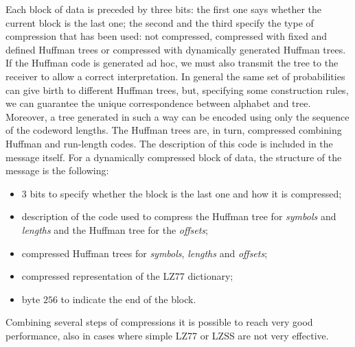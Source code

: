 Each block of data is preceded by three bits: the first one says whether the current block is the last one; the second and the third specify the type of compression that has been used: not compressed, compressed with fixed and defined Huffman trees or compressed with dynamically generated Huffman trees. If the Huffman code is generated ad hoc, we must also transmit the tree to the receiver to allow a correct interpretation. In general the same set of probabilities can give birth to different Huffman trees, but, specifying some construction rules, we can guarantee the unique correspondence between alphabet and tree. Moreover, a tree generated in such a way can be encoded using only the sequence of the codeword lengths. The Huffman trees are, in turn, compressed combining Huffman and run-length codes. The description of this code is included in the message itself. For a dynamically compressed block of data, the structure of the message is the following:
\begin{itemize}
\item
3 bits to specify whether the block is the last one and how it is compressed;

\item
description of the code used to compress the Huffman tree for \textit{symbols} and \textit{lengths} and the Huffman tree for the \textit{offsets};

\item
compressed Huffman trees for \textit{symbols}, \textit{lengths} and \textit{offsets};

\item
compressed representation of the LZ77 dictionary;

\item
byte $256$ to indicate the end of the block.
\end{itemize}

Combining several steps of compressions it is possible to reach very good performance, also in cases where simple LZ77 or LZSS are not very effective.


